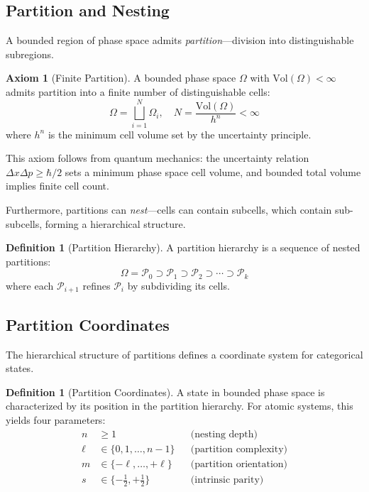 ﻿\documentclass[twocolumn,10pt,a4paper]{article}
\theoremstyle{definition}
\newtheorem{definition}[theorem]{Definition}
\newtheorem{axiom}{Axiom}
\theoremstyle{remark}
\newcommand{\Part}{\mathcal{P}}
\begin{document}
\subsection{Partition and Nesting}

A bounded region of phase space admits \emph{partition}---division into distinguishable subregions.

\begin{axiom}[Finite Partition]
\label{ax:partition}
A bounded phase space $\Omega$ with $\mathrm{Vol}(\Omega) < \infty$ admits partition into a finite number of distinguishable cells:
\begin{equation}
    \Omega = \bigsqcup_{i=1}^{N} \Omega_i, \quad N = \frac{\mathrm{Vol}(\Omega)}{h^n} < \infty
\end{equation}
where $h^n$ is the minimum cell volume set by the uncertainty principle.
\end{axiom}

This axiom follows from quantum mechanics: the uncertainty relation $\Delta x \Delta p \geq \hbar/2$ sets a minimum phase space cell volume, and bounded total volume implies finite cell count.

Furthermore, partitions can \emph{nest}---cells can contain subcells, which contain sub-subcells, forming a hierarchical structure.

\begin{definition}[Partition Hierarchy]
\label{def:hierarchy}
A partition hierarchy is a sequence of nested partitions:
\begin{equation}
    \Omega = \Part_0 \supset \Part_1 \supset \Part_2 \supset \cdots \supset \Part_k
\end{equation}
where each $\Part_{i+1}$ refines $\Part_i$ by subdividing its cells.
\end{definition}

\subsection{Partition Coordinates}

The hierarchical structure of partitions defines a coordinate system for categorical states.

\begin{definition}[Partition Coordinates]
\label{def:coords}
A state in bounded phase space is characterized by its position in the partition hierarchy. For atomic systems, this yields four parameters:
\begin{align}
    n &\geq 1 && \text{(nesting depth)} \\
    \ell &\in \{0, 1, \ldots, n-1\} && \text{(partition complexity)} \\
    m &\in \{-\ell, \ldots, +\ell\} && \text{(partition orientation)} \\
    s &\in \{-\tfrac{1}{2}, +\tfrac{1}{2}\} && \text{(intrinsic parity)}
\end{align}
\end{definition}
\end{document}
